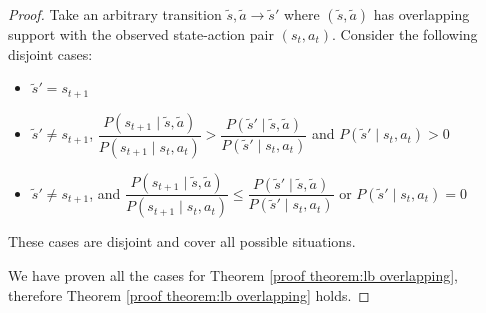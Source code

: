 \begin{proof}
Take an arbitrary transition $\tilde{s}, \tilde{a} \rightarrow \tilde{s}'$ where $(\tilde{s}, \tilde{a})$ has overlapping support with the observed state-action pair $(s_t, a_t)$. Consider the following disjoint cases:

\begin{itemize}
    \item $\tilde{s}' = s_{t+1}$
    \item $\tilde{s}' \neq s_{t+1}$, $\dfrac{P(s_{t+1} \mid \tilde{s}, \tilde{a})}{P(s_{t+1} \mid s_t, a_t)}>\dfrac{P(\tilde{s}' \mid \tilde{s}, \tilde{a})}{P(\tilde{s}' \mid s_t, a_t)}$ and $P(\tilde{s}' \mid s_t, a_t) > 0$
    \item $\tilde{s}' \neq s_{t+1}$, and $\dfrac{P(s_{t+1} \mid \tilde{s}, \tilde{a})}{P(s_{t+1} \mid s_t, a_t)}\leq\dfrac{P(\tilde{s}' \mid \tilde{s}, \tilde{a})}{P(\tilde{s}' \mid s_t, a_t)}$ or $P(\tilde{s}' \mid s_t, a_t) = 0$
\end{itemize}

These cases are disjoint and cover all possible situations.







We have proven all the cases for Theorem \ref{proof theorem:lb overlapping}, therefore Theorem \ref{proof theorem:lb overlapping} holds.

\end{proof}